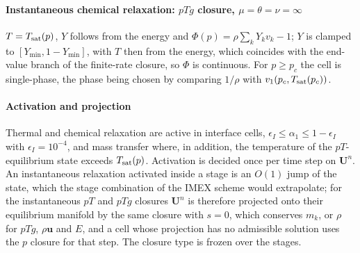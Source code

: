 \documentclass[a4paper,fleqn]{cas-sc}
\begin{document}
\paragraph{Instantaneous chemical relaxation: $pTg$ closure, $\mu=\theta=\nu=\infty$}
$T=T_{\rm sat}(p)$, $Y$ follows from the energy and $\Phi(p)=\rho\sum_kY_kv_k-1$; $Y$ is clamped to $[Y_{\min},1-Y_{\min}]$, with $T$
then from the energy, which coincides with the end-value branch of the finite-rate closure, so $\Phi$ is continuous. For
$p\ge p_c$ the cell is single-phase, the phase being chosen by comparing $1/\rho$ with $v_1(p_c,T_{\rm sat}(p_c))$.

\paragraph{Activation and projection}
Thermal and chemical relaxation are active in interface cells,
$\epsilon_I\le\alpha_1\le1-\epsilon_I$ with $\epsilon_I=10^{-4}$, and mass transfer where, in addition, the temperature of the $pT$-equilibrium
state exceeds $T_{\rm sat}(p)$. Activation is decided once per
time step on $\mathbf U^n$. An instantaneous relaxation activated inside a stage is an $O(1)$ jump of the state, which the stage
combination of the IMEX scheme would extrapolate; for the instantaneous $pT$ and $pTg$ closures $\mathbf U^n$ is therefore projected
onto their equilibrium manifold by the same closure with $s=0$, which conserves $m_k$, or $\rho$ for $pTg$, $\rho\mathbf u$ and $E$, and a cell whose
projection has no admissible solution uses the $p$ closure for that step. The closure type is frozen over the
stages.
\end{document}
